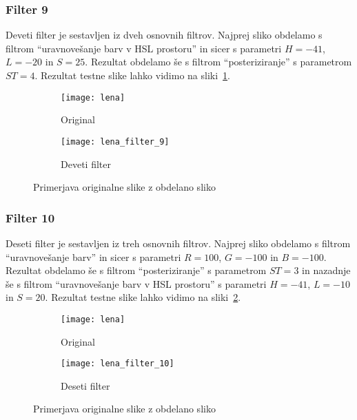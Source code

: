 \subsubsection*{Filter 9}
Deveti filter je sestavljen iz dveh osnovnih filtrov. Najprej sliko obdelamo s
filtrom ``uravnovešanje barv v HSL prostoru'' in sicer s parametri $H = -41$,
$L = -20$ in $S = 25$. Rezultat obdelamo še s filtrom ``posteriziranje'' s
parametrom $ST = 4$. Rezultat testne slike lahko vidimo na
sliki~\ref{fig:lena_filter_9}.

\begin{figure}[h]
    \centering
    \begin{subfigure}[b]{0.4\textwidth}
        \texttt{[image: lena]}
        \caption{Original}
    \end{subfigure}
    \begin{subfigure}[b]{0.4\textwidth}
        \texttt{[image: lena\_filter\_9]}
        \caption{Deveti filter}
    \end{subfigure}
    \caption{Primerjava originalne slike z obdelano sliko}
    \label{fig:lena_filter_9}
\end{figure}


\subsubsection*{Filter 10}
Deseti filter je sestavljen iz treh osnovnih filtrov. Najprej sliko obdelamo s
filtrom ``uravnovešanje barv'' in sicer s parametri $R = 100$, $G = -100$ in
$B = -100$. Rezultat obdelamo še s filtrom ``posteriziranje'' s parametrom
$ST= 3$ in nazadnje še s filtrom ``uravnovešanje barv v HSL prostoru'' s
parametri $H = -41$, $L = -10$ in $S = 20$. Rezultat testne slike lahko
vidimo na sliki~\ref{fig:lena_filter_10}.

\begin{figure}[h]
    \centering
    \begin{subfigure}[b]{0.4\textwidth}
        \texttt{[image: lena]}
        \caption{Original}
    \end{subfigure}
    \begin{subfigure}[b]{0.4\textwidth}
        \texttt{[image: lena\_filter\_10]}
        \caption{Deseti filter}
    \end{subfigure}
    \caption{Primerjava originalne slike z obdelano sliko}
    \label{fig:lena_filter_10}
\end{figure}


